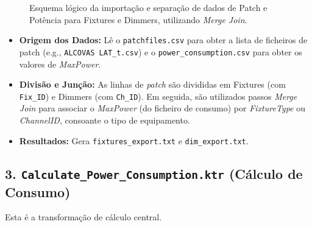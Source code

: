 \documentclass[a4paper, 12pt]{article}
\begin{document}
	\begin{figure}[h!]
		\centering
		\caption{Esquema lógico da importação e separação de dados de Patch e Potência para Fixtures e Dimmers, utilizando \textit{Merge Join}.}
		\label{fig:patch_flow}
	\end{figure}
	
	\newpage
	
	\begin{itemize}
		\item \textbf{Origem dos Dados:} Lê o \texttt{patchfiles.csv} para obter a lista de ficheiros de patch (e.g., \texttt{ALCOVAS LAT\_t.csv}) e o \texttt{power\_consumption.csv} para obter os valores de \textit{MaxPower}.
		\item \textbf{Divisão e Junção:} As linhas de \textit{patch} são divididas em Fixtures (com \texttt{Fix\_ID}) e Dimmers (com \texttt{Ch\_ID}). Em seguida, são utilizados passos \textit{Merge Join} para associar o \textit{MaxPower} (do ficheiro de consumo) por \textit{FixtureType} ou \textit{ChannelID}, consoante o tipo de equipamento.
		\item \textbf{Resultados:} Gera \texttt{fixtures\_export.txt} e \texttt{dim\_export.txt}.
	\end{itemize}
	
	\subsection{3. \texttt{Calculate\_Power\_Consumption.ktr} (Cálculo de Consumo)}
	Esta é a transformação de cálculo central.
	
\end{document}

